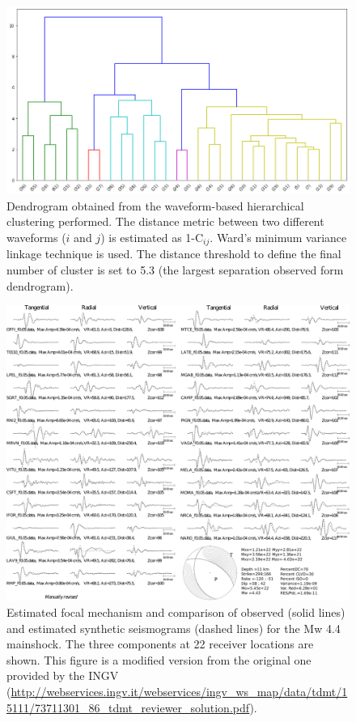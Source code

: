 \documentclass[a4paper,12pt]{article}
\begin{document}
\begin{figure}
\renewcommand{\thefigure}{S\arabic{figure}}
\begin{center}
 \noindent\includegraphics[width=1\linewidth]{dendrogram_balsorano.png} 
\end{center}
\caption{Dendrogram obtained from the waveform-based hierarchical clustering performed. The distance metric between two different waveforms ($i$ and $j$) is estimated as 1-C$_{ij}$. Ward's minimum variance linkage technique is used. The distance threshold to define the final number of cluster is set to 5.3 (the largest separation observed form dendrogram).}
\label{fig:dendrogram}
\end{figure}

\begin{figure}
\renewcommand{\thefigure}{S\arabic{figure}}
\begin{center}
 \noindent \includegraphics[width=1\linewidth]{S2_Focal_synthetics} 
\end{center}
\caption{Estimated focal mechanism and comparison of observed (solid lines) and estimated synthetic seismograms (dashed lines) for the Mw 4.4 mainshock. The three components at 22 receiver locations are shown. This figure is a modified version from the original one provided by the INGV (\url{http://webservices.ingv.it/webservices/ingv_ws_map/data/tdmt/15111/73711301_86_tdmt_reviewer_solution.pdf}).}\label{fig:S2_focal_mechanism}
\end{figure}
\end{document}
